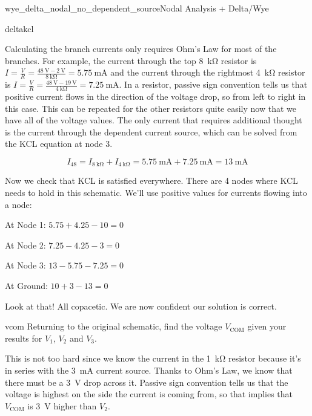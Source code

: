 \begin{mainquestion}{wye_delta_nodal_no_dependent_source}{Nodal Analysis + Delta/Wye}
\begin{partquestion}{deltakcl}
\begin{answer}
Calculating the branch currents only requires Ohm’s Law for most of the branches. For example, the current through the top \qty{8}{\kilo\ohm} resistor is
\( I = \frac{V}{R} = \frac{\qty{48}{\volt} - \qty{2}{\volt}}{\qty{8}{\kilo\ohm}} = \qty{5.75}{\milli\ampere} \) and the current through the rightmost \qty{4}{\kilo\ohm} resistor is \( I = \frac{V}{R} = \frac{\qty{48}{\volt} - \qty{19}{\volt}}{\qty{4}{\kilo\ohm}} = \qty{7.25}{\milli\ampere} \). In a resistor, passive sign convention tells us that positive current flows in the direction of the voltage drop, so from left to right in this case. This can be repeated for the other resistors quite easily now that we have all of the voltage values. The only current that requires additional thought is the current through the dependent current source, which can be solved from the KCL equation at node 3.

\[
I_{48} = I_{\qty{8}{\kilo\ohm}} + I_{\qty{4}{\kilo\ohm}} = \qty{5.75}{\milli\ampere} + \qty{7.25}{\milli\ampere} = \qty{13}{\milli\ampere}
\]

Now we check that KCL is satisfied everywhere. There are 4 nodes where KCL needs to hold in this schematic. We’ll use positive values for currents flowing into a node:

At Node 1: \( 5.75 + 4.25 - 10 = 0 \)

At Node 2: \( 7.25 - 4.25 - 3 = 0 \)

At Node 3: \( 13 - 5.75 - 7.25 = 0 \)

At Ground: \( 10 + 3 - 13 = 0 \)

Look at that! All copacetic. We are now confident our solution is correct.

\end{answer}
\end{partquestion}

\begin{partquestion}{vcom}
{Returning to the original schematic, find the voltage $V_{\text{COM}}$ given your results for $V_1$, $V_2$ and $V_3$.}
\begin{answer}
This is not too hard since we know the current in the \qty{1}{\kilo\ohm} resistor because it’s in series with the \qty{3}{\milli\ampere} current source. Thanks to Ohm’s Law, we know that there must be a \qty{3}{\volt} drop across it. Passive sign convention tells us that the voltage is highest on the side the current is coming from, so that implies that $V_{\mathrm{COM}}$ is \qty{3}{\volt} higher than $V_2$.


\end{answer}
\end{partquestion}
\end{mainquestion}
